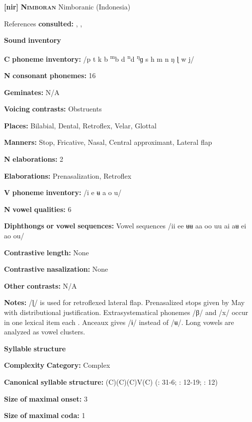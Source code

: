\textbf{[nir]}   \textbf{\textsc{Nimboran}}  Nimboranic (Indonesia)

References \textbf{consulted:} \citet{Anceaux1965}, \citet{May1997}, \citet{MayMay1981}

\textbf{Sound} \textbf{inventory}

\textbf{C} \textbf{phoneme} \textbf{inventory:} /p t k b \textsuperscript{m}b d \textsuperscript{n}d \textsuperscript{ŋ}ɡ s h m n ŋ ɭ w j/

\textbf{N} \textbf{consonant} \textbf{phonemes:} 16

\textbf{Geminates:} N/A

\textbf{Voicing} \textbf{contrasts:} Obstruents

\textbf{Places:} Bilabial, Dental, Retroflex, Velar, Glottal

\textbf{Manners:} Stop, Fricative, Nasal, Central approximant, Lateral flap

\textbf{N} \textbf{elaborations:} 2

\textbf{Elaborations:} Prenasalization, Retroflex

\textbf{V} \textbf{phoneme} \textbf{inventory:} /i e ʉ a o u/

\textbf{N} \textbf{vowel} \textbf{qualities:} 6

\textbf{Diphthongs} \textbf{or} \textbf{vowel} \textbf{sequences:} Vowel sequences /ii ee ʉʉ aa oo uu ai aʉ ei ao ou/

\textbf{Contrastive} \textbf{length:} None

\textbf{Contrastive} \textbf{nasalization:} None

\textbf{Other} \textbf{contrasts:} N/A

\textbf{Notes:} /ɭ/ is used for retroflexed lateral flap. Prenasalized stops given by May with distributional justification. Extrasystematical phonemes /β/ and /x/ occur in one lexical item each \citep[9]{Anceaux1965}. Anceaux gives /ɨ/ instead of /ʉ/. Long vowels are analyzed as vowel clusters.

\textbf{Syllable} \textbf{structure}

\textbf{Complexity} \textbf{Category:} Complex

\textbf{Canonical} \textbf{syllable} \textbf{structure:} (C)(C)(C)V(C) (\citealt{Anceaux1965}: 31-6; \citealt{May1997}: 12-19; \citealt{MayMay1981}: 12)

\textbf{Size} \textbf{of} \textbf{maximal} \textbf{onset:} 3

\textbf{Size} \textbf{of} \textbf{maximal} \textbf{coda:} 1

